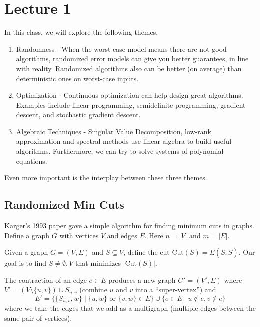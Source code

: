\newcommand{\Cut}{\textrm{Cut}}
\section{Lecture 1}
In this class, we will explore the following themes.
\begin{enumerate}
    \item Randomness - When the worst-case model means there are not good algorithms,
    randomized error models can give you better guarantees, in line with reality. Randomized
    algorithms also can be better (on average) than deterministic ones on worst-case inputs.
    \item Optimization - Continuous optimization
    can help design great algorithms. Examples include linear programming, semidefinite programming,
    gradient descent, and stochastic gradient descent.
    \item Algebraic Techniques - Singular Value Decomposition, low-rank approximation
    and spectral methods use linear algebra to build useful algorithms. Furthermore, we
    can try to solve systems of polynomial equations.
\end{enumerate}
Even more important is the interplay between these three themes.

\subsection{Randomized Min Cuts}
Karger's 1993 paper gave a simple algorithm for finding minimum cuts in graphs.
Define a graph $G$ with vertices $V$ and edges $E$. Here $ n = |V|$ and $m = |E|$.
\begin{definition}
    Given a graph $G = (V, E)$ and $S \subseteq V$,
    define the cut $\Cut(S) = E(S, \bar{S})$.
    Our goal is to find $S \neq \emptyset, V$ that minimizes $|\Cut(S)|$.
\end{definition}

\begin{definition}[Contraction]
    The contraction of an edge $e \in E$ produces a new graph $G' = (V', E)$
    where $V' = (V \setminus \{u, v\}) \cup S_{u, v}$ (combine $u$ and $v$ into a ``super-vertex'') and
    \[ E' = \{ \{S_{u, v}, w\} \mid \{u, w\} \text{ or } \{v, w\} \in E \} \cup \{ e \in E \mid u \notin e, v \notin e \} \]
    where we take the edges that we add as a multigraph (multiple edges between the same pair of vertices).
\end{definition}

